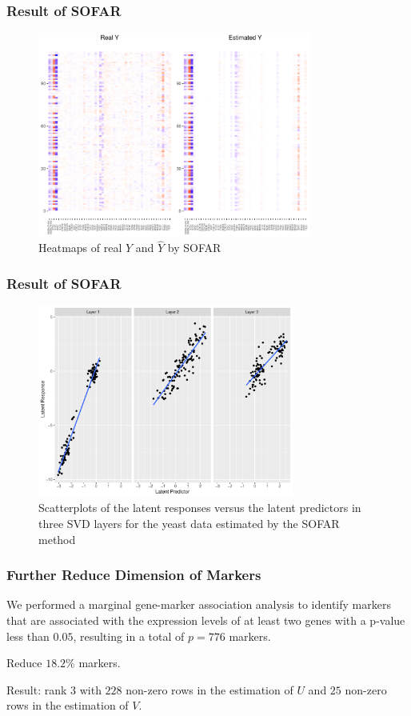 \begin{frame}
    \frametitle{Result of SOFAR}
    \begin{figure}[h]
        \centering
        \includegraphics[width=0.8\textwidth]{./figs/heatmap1.pdf}
        \caption{Heatmaps of real $Y$ and $\hat{Y}$ by SOFAR}
    \end{figure}
\end{frame}

\begin{frame}
    \frametitle{Result of SOFAR}
    \begin{figure}[h]
        \centering
        \includegraphics[width=0.75\textwidth]{./figs/latent1.pdf}
        \caption{Scatterplots of the latent responses versus the latent predictors in three SVD layers for the yeast data estimated by the SOFAR method}
    \end{figure}
\end{frame}


\begin{frame}
    \frametitle{Further Reduce Dimension of Markers}

    We performed a marginal gene-marker association analysis to identify markers that are associated with the expression levels of at least two genes with a p-value less than $0.05$, resulting in a total of $p = 776$ markers.

    Reduce $18.2\%$ markers.  

    Result: rank $3$ with $228$ non-zero rows in the estimation of $U$ and $25$ non-zero rows in the estimation of $V$. 
\end{frame}


